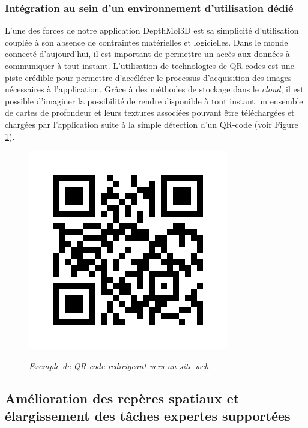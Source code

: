 \subsubsection*{Intégration au sein d'un environnement d'utilisation dédié}

L'une des forces de notre application DepthMol3D est sa simplicité d'utilisation couplée à son absence de contraintes matérielles et logicielles. Dans le monde connecté d'aujourd'hui, il est important de permettre un accès aux données à communiquer à tout instant. L'utilisation de technologies de QR-codes est une piste crédible pour permettre d'accélérer le processus d'acquisition des images nécessaires à l'application. Grâce à des méthodes de stockage dans le \textit{cloud}, il est possible d'imaginer la possibilité de rendre disponible à tout instant un ensemble de cartes de profondeur et leurs textures associées pouvant être téléchargées et chargées par l'application suite à la simple détection d'un QR-code (voir Figure \ref{Fig:qr_code}).

\begin{figure}[h]
  \centering
  {\includegraphics[width=.75\linewidth]{./figures/conclusion/qr_code.jpg}}
    \caption{{\it Exemple de QR-code redirigeant vers un site web.}}
  \label{Fig:qr_code}
  \hspace{0.2cm}
\end{figure}

\subsection*{Amélioration des repères spatiaux et élargissement des tâches expertes supportées}

